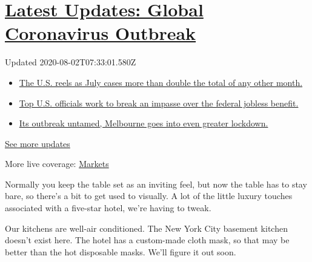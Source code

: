 \hypertarget{latest-updates-global-coronavirus-outbreak}{%
\section{\texorpdfstring{\href{https://www.nytimes.com/2020/08/01/world/coronavirus-covid-19.html?action=click\&pgtype=Article\&state=default\&region=MAIN_CONTENT_1\&context=storylines_live_updates}{Latest
Updates: Global Coronavirus
Outbreak}}{Latest Updates: Global Coronavirus Outbreak}}\label{latest-updates-global-coronavirus-outbreak}}

Updated 2020-08-02T07:33:01.580Z

\begin{itemize}
\tightlist
\item
  \href{https://www.nytimes.com/2020/08/01/world/coronavirus-covid-19.html?action=click\&pgtype=Article\&state=default\&region=MAIN_CONTENT_1\&context=storylines_live_updates\#link-34047410}{The
  U.S. reels as July cases more than double the total of any other
  month.}
\item
  \href{https://www.nytimes.com/2020/08/01/world/coronavirus-covid-19.html?action=click\&pgtype=Article\&state=default\&region=MAIN_CONTENT_1\&context=storylines_live_updates\#link-780ec966}{Top
  U.S. officials work to break an impasse over the federal jobless
  benefit.}
\item
  \href{https://www.nytimes.com/2020/08/01/world/coronavirus-covid-19.html?action=click\&pgtype=Article\&state=default\&region=MAIN_CONTENT_1\&context=storylines_live_updates\#link-2bc8948}{Its
  outbreak untamed, Melbourne goes into even greater lockdown.}
\end{itemize}

\href{https://www.nytimes.com/2020/08/01/world/coronavirus-covid-19.html?action=click\&pgtype=Article\&state=default\&region=MAIN_CONTENT_1\&context=storylines_live_updates}{See
more updates}

More live coverage:
\href{https://www.nytimes.com/live/2020/07/31/business/stock-market-today-coronavirus?action=click\&pgtype=Article\&state=default\&region=MAIN_CONTENT_1\&context=storylines_live_updates}{Markets}

Normally you keep the table set as an inviting feel, but now the table
has to stay bare, so there's a bit to get used to visually. A lot of the
little luxury touches associated with a five-star hotel, we're having to
tweak.

Our kitchens are well-air conditioned. The New York City basement
kitchen doesn't exist here. The hotel has a custom-made cloth mask, so
that may be better than the hot disposable masks. We'll figure it out
soon.

